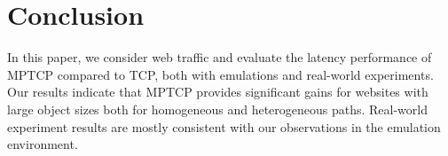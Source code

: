 \section{Conclusion}
\label{sec:conclusion}
In this paper, we consider web traffic and evaluate the latency performance of MPTCP compared to TCP, both with emulations and real-world experiments. Our results indicate that MPTCP provides significant gains for websites with large object sizes both for homogeneous and heterogeneous paths. Real-world experiment results are mostly consistent with our observations in the emulation environment.




